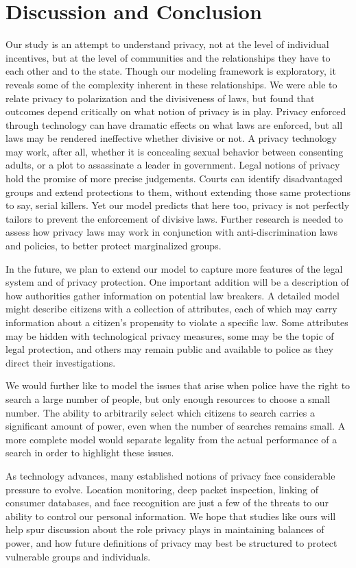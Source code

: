 
\section{Discussion and Conclusion}
\label{sec:concl}

Our study is an attempt to understand privacy, not at the level of individual incentives, but at the level of communities and the relationships they have to each other and to the state.  Though our modeling framework is exploratory, it reveals some of the complexity inherent in these relationships.  We were able to relate privacy to polarization and the divisiveness of laws, but found that outcomes depend critically on what notion of privacy is in play.  Privacy enforced through technology can have dramatic effects on what laws are enforced, but all laws may be rendered ineffective whether divisive or not.  A privacy technology may work, after all, whether it is concealing sexual behavior between consenting adults, or a plot to assassinate a leader in government.  Legal notions of privacy hold the promise of more precise judgements.  Courts can identify disadvantaged groups and extend protections to them, without extending those same protections to say, serial killers.  Yet our model predicts that here too, privacy is not perfectly tailors to prevent the enforcement of divisive laws.  Further research is needed to assess how privacy laws may work in conjunction with anti-discrimination laws and policies, to better protect marginalized groups. 

In the future, we plan to extend our model to capture more features of the legal system and of privacy protection.  One important addition will be a description of how authorities gather information on potential law breakers.  A detailed model might describe citizens with a collection of attributes, each of which may carry information about a citizen's propensity to violate a specific law.  Some attributes may be hidden with technological privacy measures, some may be the topic of legal protection, and others may remain public and available to police as they direct their investigations.  

We would further like to model the issues that arise when police have the right to search a large number of people, but only enough resources to choose a small number.  The ability to arbitrarily select which citizens to search carries a significant amount of power, even when the number of searches remains small.  A more complete model would separate legality from the actual performance of a search in order to highlight these issues.

As technology advances, many established notions of privacy face considerable pressure to evolve.  Location monitoring, deep packet inspection, linking of consumer databases, and face recognition are just a few of the threats to our ability to control our personal information.  We hope that studies like ours will help spur discussion about the role privacy plays in maintaining balances of power, and how future definitions of privacy may best be structured to protect vulnerable groups and individuals.


